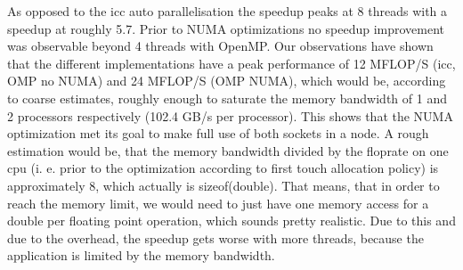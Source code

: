 As opposed to the icc auto parallelisation the speedup peaks at 8 threads with a speedup at roughly 5.7. Prior to NUMA optimizations no speedup improvement was observable beyond 4 threads with OpenMP. Our observations have shown that the different implementations have a peak performance of 12 MFLOP/S (icc, OMP no NUMA) and 24 MFLOP/S (OMP NUMA), which would be, according to coarse estimates, roughly enough to saturate the memory bandwidth of 1 and 2 processors respectively (102.4 GB/s per processor). This shows that the NUMA optimization met its goal to make full use of both sockets in a node. A rough estimation would be, that the memory bandwidth divided by the floprate on one cpu (i. e. prior to the optimization according to first touch allocation policy) is approximately 8, which actually is sizeof(double). That means, that in order to reach the memory limit, we would need to just have one memory access for a double per floating point operation, which sounds pretty realistic. Due to this and due to the overhead, the speedup gets worse with more threads, because the application is limited by the memory bandwidth.
